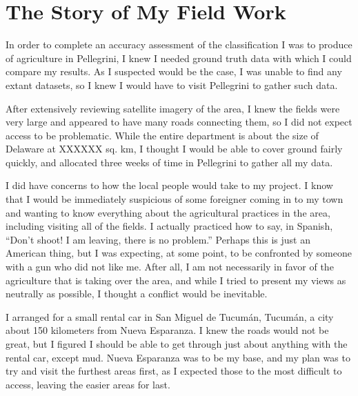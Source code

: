 \chapter{The Story of My Field Work}
\label{appendix:fieldwork}

In order to complete an accuracy assessment of the classification I was to produce of agriculture in Pellegrini, I knew I needed ground truth data with which I could compare my results. As I suspected would be the case, I was unable to find any extant datasets, so I knew I would have to visit Pellegrini to gather such data.

After extensively reviewing satellite imagery of the area, I knew the fields were very large and appeared to have many roads connecting them, so I did not expect access to be problematic. While the entire department is about the size of Delaware at XXXXXX sq. km, I thought I would be able to cover ground fairly quickly, and allocated three weeks of time in Pellegrini to gather all my data.

I did have concerns to how the local people would take to my project. I know that I would be immediately suspicious of some foreigner coming in to my town and wanting to know everything about the agricultural practices in the area, including visiting all of the fields. I actually practiced how to say, in Spanish, “Don’t shoot! I am leaving, there is no problem.” Perhaps this is just an American thing, but I was expecting, at some point, to be confronted by someone with a gun who did not like me. After all, I am not necessarily in favor of the agriculture that is taking over the area, and while I tried to present my views as neutrally as possible, I thought a conflict would be inevitable.

I arranged for a small rental car in San Miguel de Tucumán, Tucumán, a city about 150 kilometers from Nueva Esparanza. I knew the roads would not be great, but I figured I should be able to get through just about anything with the rental car, except mud. Nueva Esparanza was to be my base, and my plan was to try and visit the furthest areas first, as I expected those to the most difficult to access, leaving the easier areas for last.

